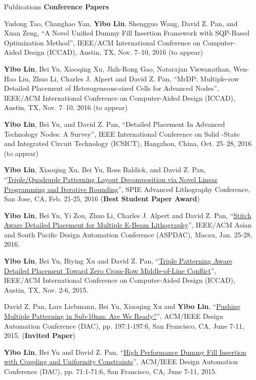 \begin{rSection}{Publications}
\textbf{Conference Papers}
\begin{description}[font=\normalfont]
\item[{[C8]}]{
    Yudong Tao, Changhao Yan, \textbf{Yibo Lin}, Shengguo Wang, David Z. Pan, and Xuan Zeng, 
    ``A Novel Unified Dummy Fill Insertion Framework with SQP-Based Optimization Method'', 
    IEEE/ACM International Conference on Computer-Aided Design (ICCAD), Austin, TX, Nov. 7–10, 2016
    (to appear)
}
\item[{[C7]}]{
    \textbf{Yibo Lin}, Bei Yu, Xiaoqing Xu, Jhih-Rong Gao, Natarajan Viswanathan, Wen-Hao Liu, Zhuo Li, Charles J. Alpert and David Z. Pan, 
    ``MrDP: Multiple-row Detailed Placement of Heterogeneous-sized Cells for Advanced Nodes'', 
    IEEE/ACM International Conference on Computer-Aided Design (ICCAD), Austin, TX, Nov. 7–10, 2016
    (to appear)
}
\item[{[C6]}]{
    \textbf{Yibo Lin}, Bei Yu, and David Z. Pan, 
   ``Detailed Placement In Advanced Technology Nodes: A Survey'', 
   IEEE International Conference on Solid -State and Integrated Circuit Technology (ICSICT), Hangzhou, China, Oct. 25–28, 2016
    (to appear)
}
\item[{[C5]}]{
    \textbf{Yibo Lin}, Xiaoqing Xu, Bei Yu, Ross Baldick, and David Z. Pan, 
 ``\href{proceedings.spiedigitallibrary.org/proceeding.aspx?articleid=2505329}{Triple/Quadruple Patterning Layout Decomposition via Novel Linear Programming and Iterative Rounding}'', 
    SPIE Advanced Lithography Conference, San Jose, CA, Feb. 21-25, 2016
    (\textbf{Best Student Paper Award})
}
\item[{[C4]}]{
 \textbf{Yibo Lin}, Bei Yu, Yi Zou, Zhuo Li, Charles J. Alpert and David Z. Pan, 
 ``\href{http://ieeexplore.ieee.org/xpl/articleDetails.jsp?arnumber=7428009}{Stitch Aware Detailed Placement for Multiple E-Beam Lithography}'', 
    IEEE/ACM Asian and South Pacific Design Automation Conference (ASPDAC), Macau, Jan. 25-28, 2016.
}
\item[{[C3]}]{
 \textbf{Yibo Lin}, Bei Yu, Biying Xu and David Z. Pan, 
 ``\href{http://dl.acm.org/citation.cfm?id=2840875}{Triple Patterning Aware Detailed Placement Toward Zero Cross-Row Middle-of-Line Conflict}'', 
    IEEE/ACM International Conference on Computer-Aided Design (ICCAD), Austin, TX, Nov. 2-6, 2015.
}
\item[{[C2]}]{
 David Z. Pan, Lars Liebmann, Bei Yu, Xiaoqing Xu and \textbf{Yibo Lin}, 
 ``\href{http://dl.acm.org/citation.cfm?id=2744769.2747940}{Pushing Multiple Patterning in Sub-10nm: Are We Ready?}'', 
    ACM/IEEE Design Automation Conference (DAC), pp. 197:1-197:6, San Francisco, CA, June 7-11, 2015. 
    (\textbf{Invited Paper})
}
\item[{[C1]}]{
 \textbf{Yibo Lin}, Bei Yu and David Z. Pan, 
 ``\href{http://dl.acm.org/citation.cfm?id=2744769.2744850}{High Performance Dummy Fill Insertion with Coupling and Uniformity Constraints}'',
    ACM/IEEE Design Automation Conference (DAC), pp. 71:1-71:6, San Francisco, CA, June 7-11, 2015. 
}
\end{description}


\end{rSection}

